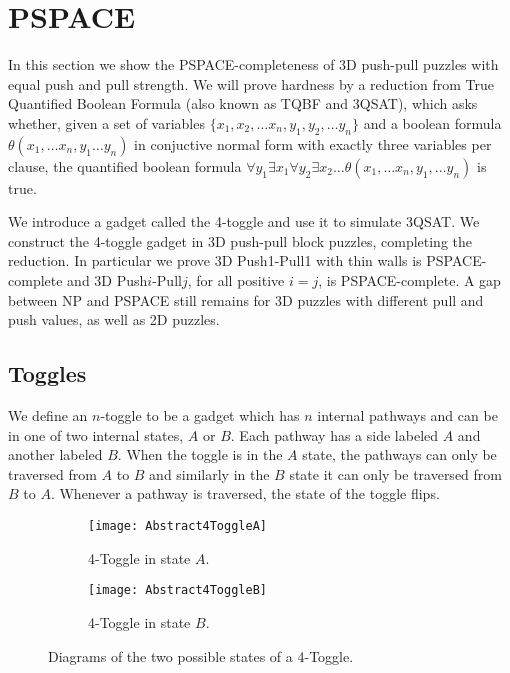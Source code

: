\section{PSPACE}
\label{3DPSPACE}
In this section we show the PSPACE-completeness of 3D push-pull puzzles with equal push and pull strength. We will prove hardness by a reduction from True Quantified Boolean Formula (also known as TQBF and 3QSAT), which asks whether, given a set of variables $\{x_1, x_2, \ldots x_n, y_1, y_2, \ldots y_n\}$ and a boolean formula $\theta(x_1, \ldots x_n, y_1 \ldots y_n)$ in conjuctive normal form with exactly three variables per clause, the quantified boolean formula $\forall y_1 \exists x_1 \forall y_2 \exists x_2 \ldots \theta(x_1, \ldots x_n, y_1, \ldots y_n)$ is true.

We introduce a gadget called the 4-toggle and use it to simulate 3QSAT\cite{NPBook}. We construct the 4-toggle gadget in 3D push-pull block puzzles, completing the reduction. In particular we prove 3D Push1-Pull1 with thin walls is PSPACE-complete and 3D Push$i$-Pull$j$, for all positive $i=j$, is PSPACE-complete. A gap between NP and PSPACE still remains for 3D puzzles with different pull and push values, as well as 2D puzzles. 


\subsection{Toggles}
We define an $n$-toggle to be a gadget which has $n$ internal pathways and can be in one of two internal states, $A$ or $B$. Each pathway has a side labeled $A$ and another labeled $B$. When the toggle is in the $A$ state, the pathways can only be traversed from $A$ to $B$ and similarly in the $B$ state it can only be traversed from $B$ to $A$. Whenever a pathway is traversed, the state of the toggle flips.

\begin{figure}[!ht]
\centering
\begin{subfigure}[t]{0.45\textwidth}
  \centering
    \texttt{[image: Abstract4ToggleA]}
    \caption{4-Toggle in state $A$. }%
    \label{fig:Abstract4ToggleA}
\end{subfigure}
\begin{subfigure}[t]{0.45\textwidth}
  \centering
    \texttt{[image: Abstract4ToggleB]}
    \caption{4-Toggle in state $B$. } %
    \label{fig:Abstract4ToggleB}
\end{subfigure}
\caption{Diagrams of the two possible states of a 4-Toggle.}
\end{figure}

